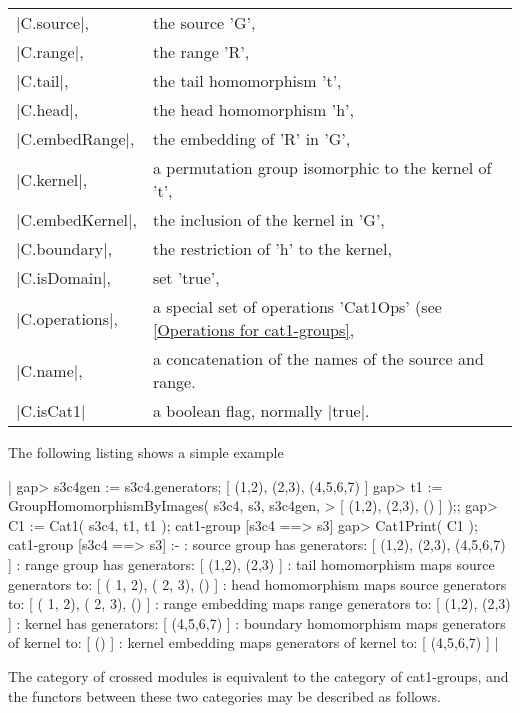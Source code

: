 \begin{tabular}{ll}
|C.source|,     & the source 'G',                                      \\
|C.range|,      & the range 'R',                                       \\
|C.tail|,       & the tail homomorphism 't',                           \\
|C.head|,       & the head homomorphism 'h',                           \\
|C.embedRange|, & the embedding of 'R' in 'G',                         \\
|C.kernel|,     & a permutation group isomorphic to the kernel of 't', \\
|C.embedKernel|,& the inclusion of the kernel in 'G',                \\
|C.boundary|,   & the restriction of 'h' to the kernel,                \\
|C.isDomain|,   & set 'true',                                          \\
|C.operations|, & a special set of operations 'Cat1Ops'
                  (see \ref{Operations for cat1-groups}, \\
|C.name|,       & a concatenation of the names of the source and range.\\
|C.isCat1| & a boolean flag, normally |true|.
\end{tabular}

The following listing shows a simple example\:

|    gap> s3c4gen := s3c4.generators;
    [ (1,2), (2,3), (4,5,6,7) ]
    gap> t1 := GroupHomomorphismByImages( s3c4, s3, s3c4gen,
    >     [ (1,2), (2,3), () ] );;
    gap> C1 := Cat1( s3c4, t1, t1 );
    cat1-group [s3c4 ==> s3] 
    gap> Cat1Print( C1 );
    cat1-group [s3c4 ==> s3] :- 
    : source group has generators:
      [ (1,2), (2,3), (4,5,6,7) ]
    :  range group has generators:
      [ (1,2), (2,3) ]
    : tail homomorphism maps source generators to:
      [ ( 1, 2), ( 2, 3), () ]
    : head homomorphism maps source generators to:
      [ ( 1, 2), ( 2, 3), () ]
    : range embedding maps range generators to:
      [ (1,2), (2,3) ]
    : kernel has generators:
      [ (4,5,6,7) ]
    : boundary homomorphism maps generators of kernel to:
      [ () ]
    : kernel embedding maps generators of kernel to:
      [ (4,5,6,7) ]  |

The  category of  crossed modules is   equivalent to  the  category of
cat1-groups, and  the  functors between these  two categories   may be
described as follows.


